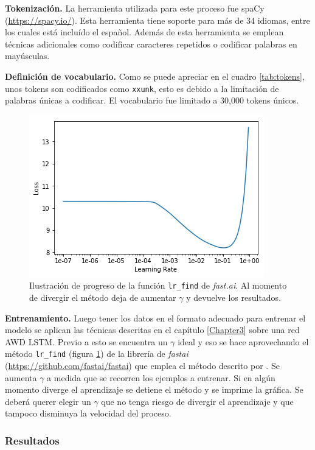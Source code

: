 \textbf{Tokenización.} La herramienta utilizada para este proceso fue spaCy (\url{https://spacy.io/}). Esta herramienta tiene soporte para más de 34 idiomas, entre los cuales está incluído el español. Además de esta herramienta se emplean técnicas adicionales como codificar caracteres repetidos o codificar palabras en mayúsculas.

\textbf{Definición de vocabulario.} Como se puede apreciar en el cuadro \ref{tab:tokens}, unos tokens son codificados como \texttt{xxunk}, esto es debido a la limitación de palabras únicas a codificar. El vocabulario fue limitado a 30,000 tokens únicos.

\begin{figure}
\centering
\includegraphics[scale=1]{Figures/lrfinder.png}
\caption{Ilustración de progreso de la función \texttt{lr\_find} de \textit{fast.ai}. Al momento de divergir el método deja de aumentar $\gamma$ y devuelve los resultados.}
\label{fig:lrfind}
\end{figure}

\textbf{Entrenamiento.} Luego tener los datos en el formato adecuado para entrenar el modelo se aplican las técnicas descritas en el capítulo \ref{Chapter3} sobre una red AWD LSTM. Previo a esto se encuentra un $ \gamma $ ideal y eso se hace aprovechando el método \texttt{lr\_find} (figura \ref{fig:lrfind}) de la librería de \emph{fastai} (\url{https://github.com/fastai/fastai}) que emplea el método descrito por \textcite{smith2017convergence}. Se aumenta $\gamma$ a medida que se recorren los ejemplos a entrenar. Si en algún momento diverge el aprendizaje se detiene el método y se imprime la gráfica. Se deberá querer elegir un $\gamma$ que no tenga riesgo de divergir el aprendizaje y que tampoco disminuya la velocidad del proceso.

\subsubsection{Resultados}

